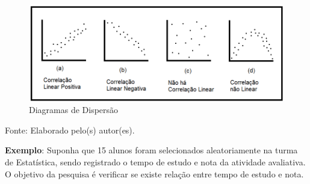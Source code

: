 \documentclass[12pt,brazil,oneside]{book}
\begin{document}
\begin{figure}[H]

{\centering \includegraphics[width=0.8\linewidth]{correlacao1} 

}

\caption{Diagramas de Dispersão}\label{fig:diag}
\end{figure}

Fonte: Elaborado pelo(s) autor(es).

\textbf{Exemplo}: Suponha que 15 alunos foram selecionados aleatoriamente na turma de Estatística, sendo registrado o tempo de estudo e nota da atividade avaliativa. O objetivo da pesquisa é verificar se existe relação entre tempo de estudo e nota.
\end{document}
